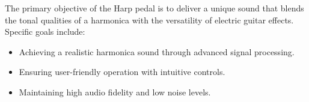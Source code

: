 The primary objective of the Harp pedal is to deliver a unique sound that blends the tonal qualities of a harmonica with the versatility of electric guitar effects. Specific goals include:
\begin{itemize}
\item Achieving a realistic harmonica sound through advanced signal processing.
\item Ensuring user-friendly operation with intuitive controls.
\item Maintaining high audio fidelity and low noise levels.
\end{itemize}
